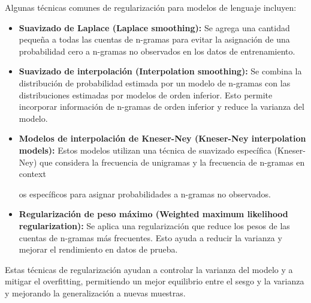Algunas técnicas comunes de regularización para modelos de lenguaje incluyen:

\begin{itemize}
    \item \textbf{Suavizado de Laplace (Laplace smoothing):} Se agrega una cantidad pequeña a todas las cuentas de n-gramas para evitar la asignación de una probabilidad cero a n-gramas no observados en los datos de entrenamiento.
    
    \item \textbf{Suavizado de interpolación (Interpolation smoothing):} Se combina la distribución de probabilidad estimada por un modelo de n-gramas con las distribuciones estimadas por modelos de orden inferior. Esto permite incorporar información de n-gramas de orden inferior y reduce la varianza del modelo.
    
    \item \textbf{Modelos de interpolación de Kneser-Ney (Kneser-Ney interpolation models):} Estos modelos utilizan una técnica de suavizado específica (Kneser-Ney) que considera la frecuencia de unigramas y la frecuencia de n-gramas en context

os específicos para asignar probabilidades a n-gramas no observados.
    
    \item \textbf{Regularización de peso máximo (Weighted maximum likelihood regularization):} Se aplica una regularización que reduce los pesos de las cuentas de n-gramas más frecuentes. Esto ayuda a reducir la varianza y mejorar el rendimiento en datos de prueba.
\end{itemize}

Estas técnicas de regularización ayudan a controlar la varianza del modelo y a mitigar el overfitting, permitiendo un mejor equilibrio entre el sesgo y la varianza y mejorando la generalización a nuevas muestras.

